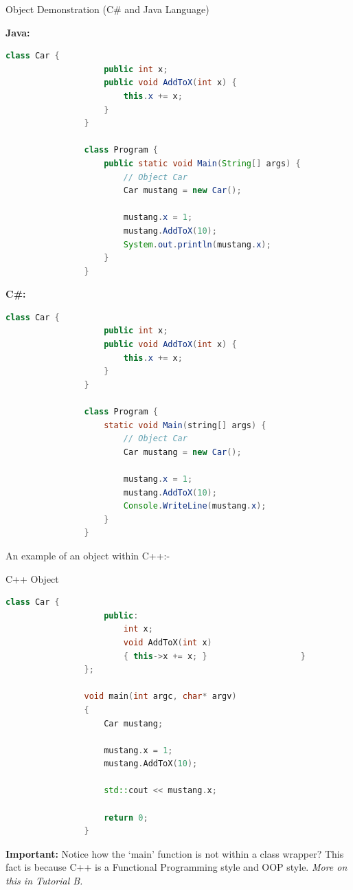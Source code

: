 \documentclass[10pt]{article}
\begin{document}
        \begin{example}{Object Demonstration (C\# and Java Language)}

            \textbf{Java:}
            \begin{lstlisting}[language=java]
                class Car {
                    public int x;
                    public void AddToX(int x) {
                        this.x += x;
                    }
                }

                class Program { 
                    public static void Main(String[] args) {
                        // Object Car 
                        Car mustang = new Car();

                        mustang.x = 1;
                        mustang.AddToX(10);
                        System.out.println(mustang.x);
                    }
                }
            \end{lstlisting}

            \textbf{C\#:}
            \begin{lstlisting}[language=java]
                class Car {
                    public int x;
                    public void AddToX(int x) {
                        this.x += x;
                    }
                }

                class Program { 
                    static void Main(string[] args) {
                        // Object Car 
                        Car mustang = new Car();
                
                        mustang.x = 1;
                        mustang.AddToX(10);
                        Console.WriteLine(mustang.x);
                    }
                }
            \end{lstlisting}
        \end{example}

        \newpage
        An example of an object within C++:-
        \begin{example}{C++ Object}
            \begin{lstlisting}[language=c++]
                class Car {
                    public:
                        int x;
                        void AddToX(int x)
                        { this->x += x; }                   }
                };

                void main(int argc, char* argv)
                {
                    Car mustang;
                    
                    mustang.x = 1;
                    mustang.AddToX(10);
                    
                    std::cout << mustang.x;

                    return 0;
                }
            \end{lstlisting}

            \textbf{Important:} Notice how the `main' function is not within a class wrapper? This fact is because C++ is a Functional Programming style and OOP style. \textit{More on this in Tutorial B.}
        \end{example}
\end{document}
